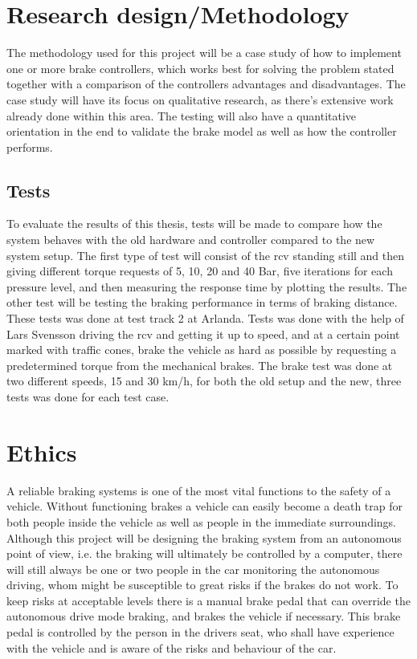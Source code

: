 \documentclass[a4paper,11pt]{kth-mag}
\begin{document}
 
\section{Research design/Methodology}
The methodology used for this project will be a case study of how to implement one or more brake controllers, which works best for solving the problem stated together with a comparison of the controllers advantages and disadvantages. The case study will have its focus on qualitative research, as there's extensive work already done within this area. The testing will also have a quantitative orientation in the end to validate the brake model as well as how the controller performs. 

\subsection{Tests}
To evaluate the results of this thesis, tests will be made to compare how the system behaves with the old hardware and controller compared to the new system setup. The first type of test will consist of the \gls{rcv} standing still and then giving different torque requests of 5, 10, 20 and 40 Bar, five iterations for each pressure level, and then measuring the response time by plotting the results. 
The other test will be testing the braking performance in terms of braking distance. These tests was done at test track 2 at Arlanda. Tests was done with the help of Lars Svensson driving the \gls{rcv} and getting it up to speed, and at a certain point marked with traffic cones, brake the vehicle as hard as possible by requesting a predetermined torque from the mechanical brakes. The brake test was done at two different speeds, 15 and 30 km/h, for both the old setup and the new, three tests was done for each test case. 


\section{Ethics}
A reliable braking systems is one of the most vital functions to the safety of a vehicle. Without functioning brakes a vehicle can easily become a death trap for both people inside the vehicle as well as people in the immediate surroundings. 
Although this project will be designing the braking system from an autonomous point of view, i.e. the braking will ultimately be controlled by a computer, there will still always be one or two people in the car monitoring the autonomous driving, whom might be susceptible to great risks if the brakes do not work. To keep risks at acceptable levels there is a manual brake pedal that can override the autonomous drive mode braking, and brakes the vehicle if necessary. This brake pedal is controlled by the person in the drivers seat, who shall have experience with the vehicle and is aware of the risks and behaviour of the car. 
\end{document}
